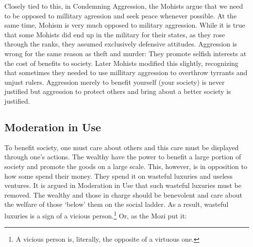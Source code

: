 Closely tied to this, in Condemning Aggression, the Mohists argue that we need to be opposed to millitary agression and seek peace whenever possible. At the same time, Mohism is very much opposed to military aggression. While it is true that some Mohists did end up in the military for their states, as they rose through the ranks, they assumed exclusively defensive attitudes. Aggression is wrong for the same reason as theft and murder: They promote selfish interests at the cost of benefits to society. Later Mohists modified this slightly, recognizing that sometimes they needed to use millitary aggression to overthrow tyrrants and unjust rulers. Aggression merely to benefit yourself (your society) is never justified but aggression to protect others and bring about a better society is justified. 

\subsection{Moderation in Use}

To benefit society, one must care about others and this care must be displayed through one's actions. The wealthy have the power to benefit a large portion of society and promote the goods on a large scale. This, however, is in opposition to how some spend their money. They spend it on wasteful luxuries and useless ventures. It is argued in Moderation in Use that such wasteful luxuries  must be removed. The wealthy and those in charge should be benevolent and care about the welfare of those `below' them on the social ladder. As a result, wasteful luxuries is a sign of a vicious person.\footnote{A vicious person is, literally, the opposite of a virtuous one.} Or, as the Mozi put it:



